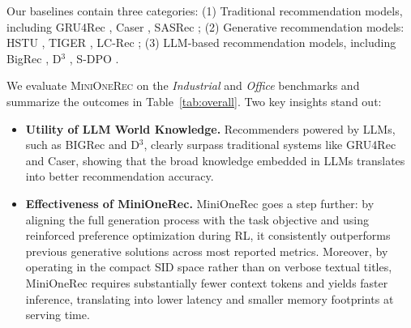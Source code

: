 

Our baselines contain three categories: (1) Traditional recommendation models, including GRU4Rec \citep{GRU4Rec}, Caser \citep{Caser}, SASRec \citep{SASRec}; (2) Generative recommendation models: HSTU \citep{HSTU}, TIGER \citep{TIGER}, LC-Rec \citep{LCRec}; (3) LLM-based recommendation models, including BigRec \citep{BIGRec}, D$^3$ \citep{D3}, S-DPO \citep{sdpo}.

We evaluate \textsc{MiniOneRec} on the \textit{Industrial} and \textit{Office} benchmarks and summarize the outcomes in Table~\ref{tab:overall}. Two key insights stand out:


\begin{itemize}
    \item \textbf{Utility of LLM World Knowledge.} Recommenders powered by LLMs, such as BIGRec and D$^{3}$, clearly surpass traditional systems like GRU4Rec and Caser, showing that the broad knowledge embedded in LLMs translates into better recommendation accuracy.  
    \item \textbf{Effectiveness of MiniOneRec.} MiniOneRec goes a step further: by aligning the full generation process with the task objective and using reinforced preference optimization during RL, it consistently outperforms previous generative solutions across most reported metrics. Moreover, by operating in the compact SID space rather than on verbose textual titles, MiniOneRec requires substantially fewer context tokens and yields faster inference, translating into lower latency and smaller memory footprints at serving time.
\end{itemize}

